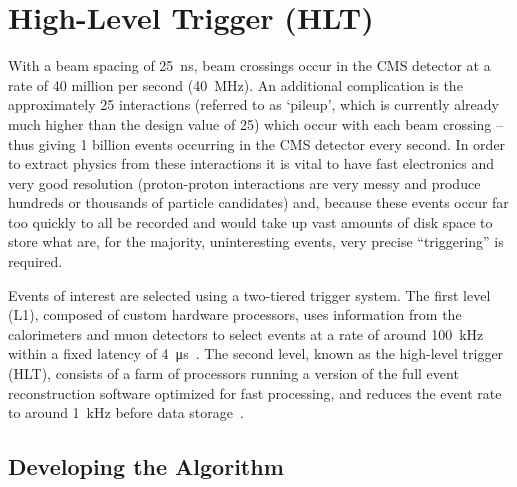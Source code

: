 \chapter{High-Level Trigger (HLT) \label{ch:HLT}}

With a beam spacing of \qty{25}{\ns}, beam crossings occur in the CMS detector at a rate of 40 million per second (\qty{40}{\MHz}). An additional complication is the approximately 25 interactions (referred to as `pileup', which is currently already much higher than the design value of 25) which occur with each beam crossing -- thus giving 1 billion events occurring in the CMS detector every second. In order to extract physics from these interactions it is vital to have fast electronics and very good resolution (proton-proton interactions are very messy and produce hundreds or thousands of particle candidates) and, because these events occur far too quickly to all be recorded and would take up vast amounts of disk space to store what are, for the majority, uninteresting events, very precise ``triggering'' is required.

Events of interest are selected using a two-tiered trigger system. The first level (L1), composed of custom hardware processors, uses information from the calorimeters and muon detectors to select events at a rate of around 100~\unit{kHz} within a fixed latency of \qty{4}{\us}~\cite{CMS:2020cmk}. The second level, known as the high-level trigger (HLT), consists of a farm of processors running a version of the full event reconstruction software optimized for fast processing, and reduces the event rate to around 1~\unit{kHz} before data storage~\cite{CMS:2016ngn}.


\section{Developing the Algorithm}
